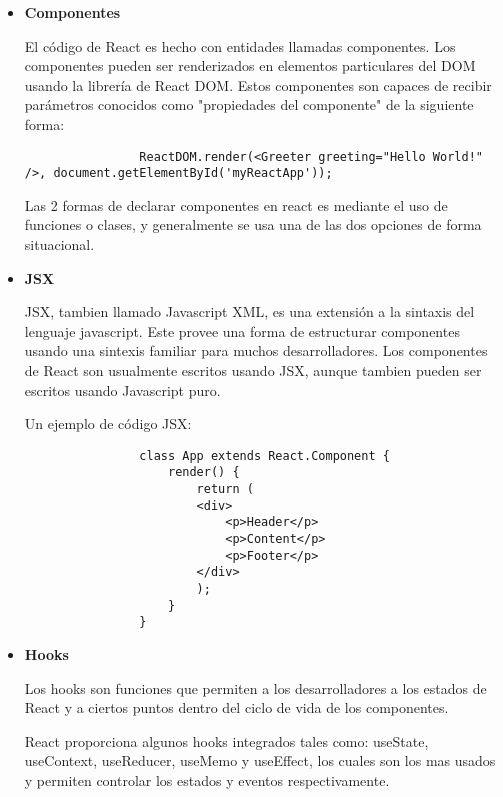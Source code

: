         \begin{itemize}

            \item \textbf{Componentes} 

            El código de React es hecho con entidades llamadas componentes. Los componentes pueden ser renderizados en elementos particulares del DOM usando la librería de React DOM. Estos componentes son capaces de recibir parámetros conocidos como "propiedades del componente" de la siguiente forma: \hfill 

            \begin{lstlisting}
                ReactDOM.render(<Greeter greeting="Hello World!" />, document.getElementById('myReactApp'));
            \end{lstlisting}

            Las 2 formas de declarar componentes en react es mediante el uso de funciones o clases, y generalmente se usa una de las dos opciones de forma situacional.

            \item \textbf{JSX}

            JSX, tambien llamado Javascript XML, es una extensión a la sintaxis del lenguaje javascript. Este provee una forma de estructurar componentes usando una sintexis familiar para muchos desarrolladores. Los componentes de React son usualmente escritos usando JSX, aunque tambien pueden ser escritos usando Javascript puro.

            Un ejemplo de código JSX:

            \begin{lstlisting}
                class App extends React.Component {
                    render() {
                        return (
                        <div>
                            <p>Header</p>
                            <p>Content</p>
                            <p>Footer</p>
                        </div>
                        );
                    }
                }
            \end{lstlisting}

            \item \textbf{Hooks}

            Los hooks son funciones que permiten a los desarrolladores  a los estados de React y a ciertos puntos dentro del ciclo de vida de los componentes.

            React proporciona algunos hooks integrados tales como: useState, useContext, useReducer, useMemo y useEffect, los cuales son los mas usados y permiten controlar los estados y eventos respectivamente.


        \end{itemize}
        
